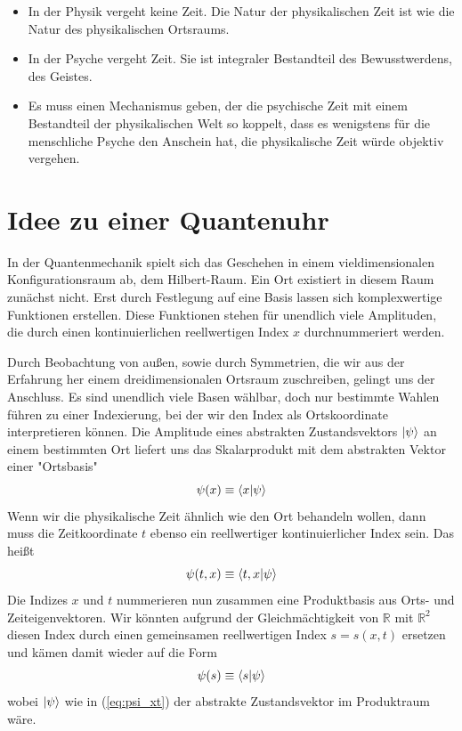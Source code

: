 \documentclass[12pt]{article}
\begin{document}
\begin{itemize}
\item In der Physik vergeht keine Zeit. Die Natur der physikalischen Zeit ist wie die Natur des physikalischen Ortsraums.
\item In der Psyche vergeht Zeit. Sie ist integraler Bestandteil des Bewusstwerdens, des Geistes. 
\item Es muss einen Mechanismus geben, der die psychische Zeit mit einem Bestandteil der physikalischen Welt so koppelt, dass es wenigstens für die menschliche Psyche den Anschein hat, die physikalische Zeit würde objektiv vergehen.
\end{itemize}

\section{Idee zu einer Quantenuhr}

In der Quantenmechanik spielt sich das Geschehen in einem vieldimensionalen Konfigurationsraum ab, dem Hilbert-Raum. Ein Ort existiert in diesem Raum zunächst nicht. Erst durch Festlegung auf eine Basis lassen sich komplexwertige Funktionen erstellen. Diese Funktionen stehen für unendlich viele Amplituden, die durch einen kontinuierlichen reellwertigen Index $x$ durchnummeriert werden.

Durch Beobachtung von außen, sowie durch Symmetrien, die wir aus der Erfahrung her einem dreidimensionalen Ortsraum zuschreiben, gelingt uns der Anschluss. Es sind unendlich viele Basen wählbar, doch nur bestimmte Wahlen führen zu einer Indexierung, bei der wir den Index als Ortskoordinate interpretieren können. Die Amplitude eines abstrakten Zustandsvektors $\ket{\psi}$ an einem bestimmten Ort liefert uns das Skalarprodukt mit dem abstrakten Vektor einer "Ortsbasis"
\begin{equation} 
\psi(x) \equiv \bra{x}\ket{\psi} 
\end{equation}
Wenn wir die physikalische Zeit ähnlich wie den Ort behandeln wollen, dann muss die Zeitkoordinate $t$ ebenso ein reellwertiger kontinuierlicher Index sein. Das heißt
\begin{equation} 
\label{eq:psi_xt}
\psi(t,x) \equiv \bra{t,x}\ket{\psi} 
\end{equation}
Die Indizes $x$ und $t$ nummerieren nun zusammen eine Produktbasis aus Orts- und Zeiteigenvektoren. Wir könnten aufgrund der Gleichmächtigkeit von $\mathbb{R}$ mit $\mathbb{R}^2$ diesen Index durch einen gemeinsamen reellwertigen Index $s = s(x,t)$ ersetzen und kämen damit wieder auf die Form
\begin{equation}
\label{eq:psi_s}
\psi(s) \equiv \bra{s}\ket{\psi} 
\end{equation}
wobei $\ket{\psi}$ wie in (\ref{eq:psi_xt}) der abstrakte Zustandsvektor im Produktraum wäre.
\end{document}
